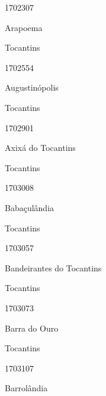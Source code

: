 \documentclass[
  letterpaper,
]{report}
\begin{document}
1702307

\n      

Arapoema

\n    

\n    

\n      

Tocantins

\n      

1702554

\n      

Augustinópolis

\n    

\n    

\n      

Tocantins

\n      

1702901

\n      

Axixá do Tocantins

\n    

\n    

\n      

Tocantins

\n      

1703008

\n      

Babaçulândia

\n    

\n    

\n      

Tocantins

\n      

1703057

\n      

Bandeirantes do Tocantins

\n    

\n    

\n      

Tocantins

\n      

1703073

\n      

Barra do Ouro

\n    

\n    

\n      

Tocantins

\n      

1703107

\n      

Barrolândia

\n    
\end{document}
